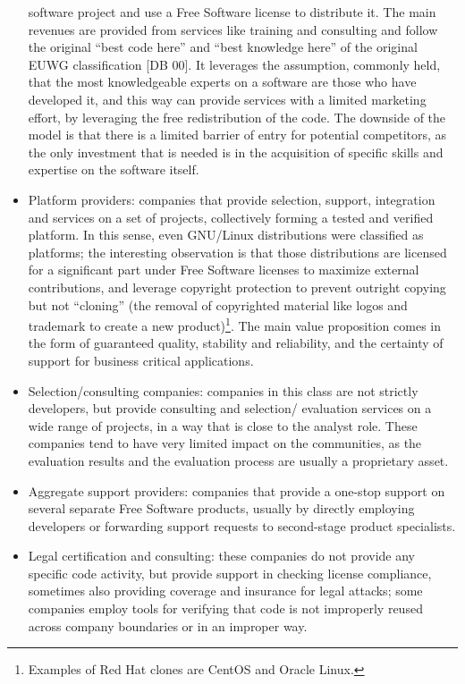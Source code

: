 \begin{itemize}
software project and use a Free Software license to distribute it. The main
revenues are provided from services like training and consulting and follow the original ``best code here'' and ``best knowledge here'' of the original EUWG classification [DB 00]. It leverages the assumption, commonly held, that the most knowledgeable experts on a software are those who have developed it, and this way can provide services with a limited marketing effort, by leveraging the free redistribution of the code. The downside of the model is that there is a limited barrier of entry for potential competitors, as the only investment that is needed is in the acquisition of specific skills and expertise on the software itself.
 \item Platform providers: companies that provide selection, support,
integration and services on a set of projects, collectively forming a tested and
verified platform. In this sense, even GNU/Linux distributions were classified
as platforms; the interesting observation is that those distributions are
licensed for a significant part under Free Software licenses to maximize
external contributions, and leverage copyright protection to prevent outright
copying but not ``cloning'' (the removal of copyrighted material like logos and
trademark to create a new product)\footnote{Examples of Red Hat clones are CentOS
and Oracle Linux.}. The main value proposition comes in the
form of guaranteed quality, stability and reliability, and the certainty of
support for business critical applications.
 \item Selection/consulting companies: companies in this class are not strictly
developers, but provide consulting and selection/ evaluation services on a wide
range of projects, in a way that is close to the analyst role. These companies
tend to have very limited impact on the communities, as the
evaluation results and the evaluation process are usually a proprietary asset.
 \item Aggregate support providers: companies that provide a one-stop support on
several separate Free Software products, usually by directly employing
developers or forwarding support requests to second-stage product specialists.
 \item Legal certification and consulting: these companies do not provide any
specific code activity, but provide support in checking license compliance,
sometimes also providing coverage and insurance for legal attacks; some
companies employ tools for verifying that code is not improperly reused across
company boundaries or in an improper way.

\end{itemize}
